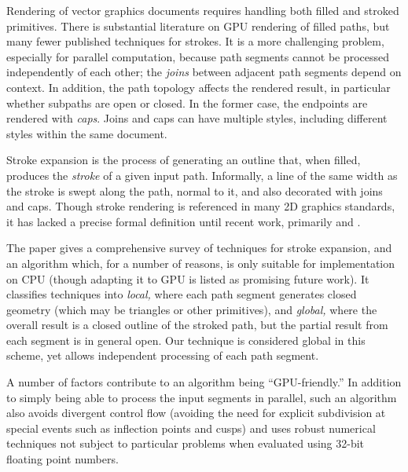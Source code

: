 \documentclass[sigconf]{acmart}
\begin{document}
Rendering of vector graphics documents requires handling both filled and stroked primitives. There is substantial literature on GPU rendering of filled paths, but many fewer published techniques for strokes. It is a more challenging problem, especially for parallel computation, because path segments cannot be processed independently of each other; the \emph{joins} between adjacent path segments depend on context. In addition, the path topology affects the rendered result, in particular whether subpaths are open or closed. In the former case, the endpoints are rendered with \emph{caps}. Joins and caps can have multiple styles, including different styles within the same document.

Stroke expansion is the process of generating an outline that, when filled, produces the \emph{stroke} of a given input path. Informally, a line of the same width as the stroke is swept along the path, normal to it, and also decorated with joins and caps. Though stroke rendering is referenced in many 2D graphics standards, it has lacked a precise formal definition until recent work, primarily \citet{Nehab2020} and \citet{Kilgard2020}.

The \citet{Nehab2020} paper gives a comprehensive survey of techniques for stroke expansion, and an algorithm which, for a number of reasons, is only suitable for implementation on CPU (though adapting it to GPU is listed as promising future work). It classifies techniques into \emph{local,} where each path segment generates closed geometry (which may be triangles or other primitives), and \emph{global,} where the overall result is a closed outline of the stroked path, but the partial result from each segment is in general open. Our technique is considered global in this scheme, yet allows independent processing of each path segment.

A number of factors contribute to an algorithm being ``GPU-friendly.'' In addition to simply being able to process the input segments in parallel, such an algorithm also avoids divergent control flow (avoiding the need for explicit subdivision at special events such as inflection points and cusps) and uses robust numerical techniques not subject to particular problems when evaluated using 32-bit floating point numbers.
\end{document}

